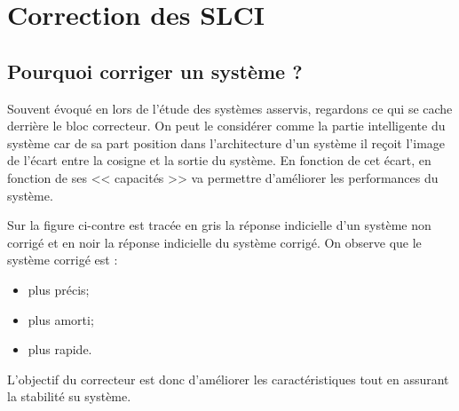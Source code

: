 \setchapterpreamble[u]{\margintoc}

\chapter{Correction des SLCI}



%




\section{Pourquoi corriger un système ?}



Souvent évoqué en lors de l'étude des systèmes asservis, regardons ce qui se cache derrière le bloc correcteur. On peut le considérer comme la partie intelligente du système car de sa part position dans l'architecture d'un système il reçoit l'image de l'écart entre la cosigne et la sortie du système. En fonction de cet écart, en fonction de ses << capacités >> va permettre d'améliorer les performances du système. 

Sur la figure ci-contre est tracée en gris la réponse indicielle d'un système non corrigé et en noir la réponse indicielle du système corrigé. On observe que le système corrigé est :
\begin{itemize}
\item plus précis;
\item plus amorti;
\item plus rapide. 
\end{itemize}
L'objectif du correcteur est donc d'améliorer les caractéristiques tout en assurant la stabilité su système.




